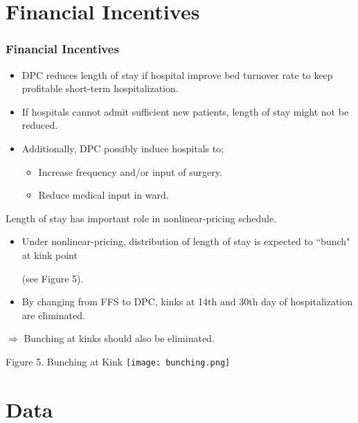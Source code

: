 \documentclass[14pt]{beamer}
\begin{document}
\section{Financial Incentives}

\begin{frame}[allowframebreaks]
\frametitle{Financial Incentives}
\begin{itemize}
\item DPC reduces length of stay if hospital improve bed turnover rate to keep profitable short-term hospitalization.
\item If hospitals cannot admit sufficient new patients, length of stay might not be reduced.
\item Additionally, DPC possibly induce hospitals to;
\begin{itemize}
\item Increase frequency and/or input of surgery.
\item Reduce medical input in ward.
\end{itemize}
\end{itemize}

\framebreak

Length of stay has important role in nonlinear-pricing schedule.
\begin{itemize}
\item Under nonlinear-pricing, distribution of length of stay is expected to ``bunch" at kink point\par (see Figure 5).
\item By changing from FFS to DPC, kinks at 14th and 30th day of hospitalization are eliminated.
\end{itemize}
$\Rightarrow$ Bunching at kinks should also be eliminated.

\framebreak

\begin{center}
{\small Figure 5. Bunching at Kink}
\texttt{[image: bunching.png]}
\end{center}

\end{frame}

\section{Data}
\end{document}
